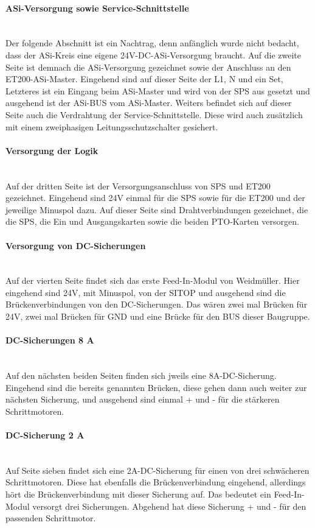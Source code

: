     \paragraph{ASi-Versorgung sowie Service-Schnittstelle}\mbox{}\\
    Der folgende Abschnitt ist ein Nachtrag, denn anfänglich wurde nicht bedacht, dass der ASi-Kreis eine eigene 24V-DC-ASi-Versorgung braucht. Auf die zweite Seite ist demnach die ASi-Versorgung gezeichnet sowie der Anschluss an den ET200-ASi-Master. Eingehend sind auf dieser Seite der L1, N und ein Set, Letzteres ist ein Eingang beim ASi-Master und wird von der SPS aus gesetzt und ausgehend ist der ASi-BUS vom ASi-Master. Weiters befindet sich auf dieser Seite auch die Verdrahtung der Service-Schnittstelle. Diese wird auch zusätzlich mit einem zweiphasigen Leitungsschutzschalter gesichert.
    \paragraph{Versorgung der Logik}\mbox{}\\
    Auf der dritten Seite ist der Versorgungsanschluss von SPS und ET200 gezeichnet. Eingehend sind 24V einmal für die SPS sowie für die ET200 und der jeweilige Minuspol dazu. Auf dieser Seite sind Drahtverbindungen gezeichnet, die die SPS, die Ein und Ausgangskarten sowie die beiden PTO-Karten versorgen.
    \paragraph{Versorgung von DC-Sicherungen}\mbox{}\\
    Auf der vierten Seite findet sich das erste Feed-In-Modul von Weidmüller. Hier eingehend sind 24V, mit Minuspol, von der SITOP und ausgehend sind die Brückenverbindungen von den DC-Sicherungen. Das wären zwei mal Brücken für 24V, zwei mal Brücken für GND und eine Brücke für den BUS dieser Baugruppe.
    \paragraph{DC-Sicherungen 8 A}\mbox{}\\
    Auf den nächsten beiden Seiten finden sich jweils eine 8A-DC-Sicherung. Eingehend sind die bereits genannten Brücken, diese gehen dann auch weiter zur nächsten Sicherung, und ausgehend sind einmal + und - für die stärkeren Schrittmotoren.
    \paragraph{DC-Sicherung 2 A}\mbox{}\\
    Auf Seite sieben findet sich eine 2A-DC-Sicherung für einen von drei schwächeren Schrittmotoren. Diese hat ebenfalls die Brückenverbindung eingehend, allerdings hört die Brückenverbindung mit dieser Sicherung auf. Das bedeutet ein Feed-In-Modul versorgt drei Sicherungen. Abgehend hat diese Sicherung + und - für den passenden Schrittmotor.
